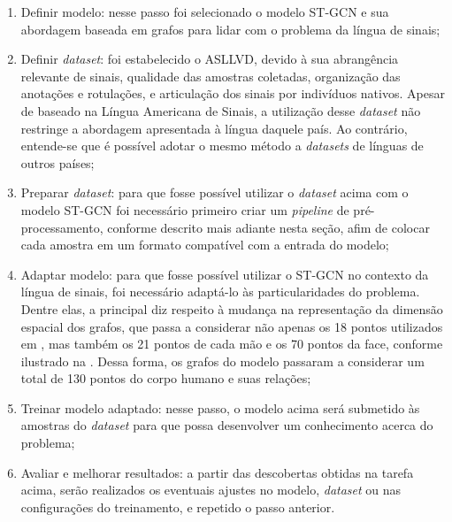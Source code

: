 \begin{enumerate}
    \item Definir modelo: nesse passo foi selecionado o modelo ST-GCN e sua abordagem baseada em grafos para lidar com o problema da língua de sinais;
    \item Definir \textit{dataset}: foi estabelecido o ASLLVD, devido à sua abrangência relevante de sinais, qualidade das amostras coletadas, organização das anotações e rotulações, e articulação dos sinais por indivíduos nativos. Apesar de baseado na Língua Americana de Sinais, a utilização desse \textit{dataset} não restringe a abordagem apresentada à língua daquele país. Ao contrário, entende-se que é possível adotar o mesmo método a \textit{datasets} de línguas de outros países;
    \item Preparar \textit{dataset}: para que fosse possível utilizar o \textit{dataset} acima com o modelo ST-GCN foi necessário primeiro criar um \textit{pipeline} de pré-processamento, conforme descrito mais adiante nesta seção, afim de colocar cada amostra em  um formato compatível com a entrada do modelo;
    \item Adaptar modelo: para que fosse possível utilizar o ST-GCN no contexto da língua de sinais, foi necessário adaptá-lo às particularidades do problema. Dentre elas, a principal diz respeito à mudança na representação da dimensão espacial dos grafos, que passa a considerar não apenas os 18 pontos utilizados em \cite{st-gcn-2018}, mas também os 21 pontos de cada mão e os 70 pontos da face, conforme ilustrado na . Dessa forma, os grafos do modelo passaram a considerar um total de 130 pontos do corpo humano e suas relações;
    \item Treinar modelo adaptado: nesse passo, o modelo acima será submetido às amostras do \textit{dataset} para que possa desenvolver um conhecimento acerca do problema;
    \item Avaliar e melhorar resultados: a partir das descobertas obtidas na tarefa acima, serão realizados os eventuais ajustes no modelo, \textit{dataset} ou nas configurações do treinamento, e repetido o passo anterior.
\end{enumerate}

